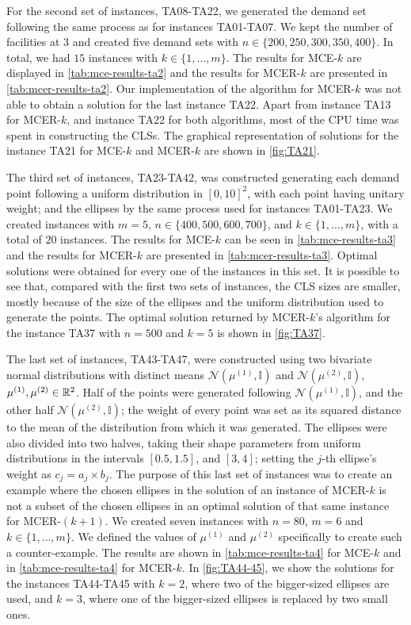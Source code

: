 For the second set of instances, TA08-TA22, we generated the demand set following the same process as for instances TA01-TA07.
We kept the number of facilities at $3$ and created five demand sets with $n\in\{200, 250, 300, 350, 400\}$. In total, we had $15$ instances with $k\in\{1, \dots, m\}$. The results for MCE-$k$ are displayed in \autoref{tab:mce-results-ta2} and the results for MCER-$k$ are presented in \autoref{tab:mcer-results-ta2}.
Our implementation of the algorithm for MCER-$k$ was not able to obtain a solution for the last instance TA22. Apart from instance TA13 for MCER-$k$, and instance TA22 for both algorithms, most of the CPU time was spent in constructing the CLSs.
The graphical representation of solutions for the instance TA21 for MCE-$k$ and MCER-$k$ are shown in \autoref{fig:TA21}.

The third set of instances, TA23-TA42, was constructed generating each demand point following a uniform distribution in $[0, 10]^2$, with each point having unitary weight; and the ellipses by the same process used for instances TA01-TA23. We created instances with $m=5$, $n\in \{400, 500, 600, 700\}$, and $k\in\{1, \dots, m\}$, with a total of $20$ instances. The results for MCE-$k$ can be seen in \autoref{tab:mce-results-ta3} and the results for MCER-$k$ are presented in \autoref{tab:mcer-results-ta3}. Optimal solutions were obtained for every one of the instances in this set. It is possible to see that, compared with the first two sets of instances, the CLS sizes are smaller, mostly because of the size of the ellipses and the uniform distribution used to generate the points. The optimal solution returned by MCER-$k$'s algorithm for the instance TA37 with $n=500$ and $k=5$ is shown in \autoref{fig:TA37}.

The last set of instances, TA43-TA47, were constructed using two bivariate normal distributions with distinct means $\mathcal{N}(\mu^{(1)}, \mathbb{I})$ and $\mathcal{N}(\mu^{(2)}, \mathbb{I})$, $\mu^{(1)}, \mu^{(2)} \in \mathbb{R}^2$. Half of the points were generated following $\mathcal{N}(\mu^{(1)}, \mathbb{I})$, and the other half $\mathcal{N}(\mu^{(2)}, \mathbb{I})$; the weight of every point was set as its squared distance to the mean of the distribution from which it was generated.
The ellipses were also divided into two halves, taking their shape parameters from uniform distributions in the intervals $[0.5, 1.5]$, and $[3, 4]$; setting the $j$-th ellipse's weight as $c_j=a_j \times b_j$.
The purpose of this last set of instances was to create an example where the chosen ellipses in the solution of an instance of MCER-$k$ is not a subset of the chosen ellipses in an optimal solution of that same instance for MCER-$(k+1)$. We created seven instances with $n=80$, $m=6$ and $k\in\{1, \dots, m\}$. We defined the values of $\mu^{(1)}$ and $\mu^{(2)}$ specifically to create such a counter-example. The results are shown in \autoref{tab:mce-results-ta4} for MCE-$k$ and in \autoref{tab:mce-results-ta4} for MCER-$k$.
In \autoref{fig:TA44-45}, we show the solutions for the instances TA44-TA45 with $k=2$, where two of the bigger-sized ellipses are used, and $k=3$, where one of the bigger-sized ellipses is replaced by two small ones.

